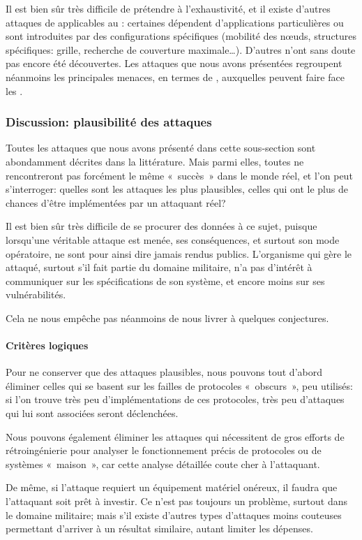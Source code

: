 Il est bien sûr très difficile de prétendre à l'exhaustivité, et il existe d'autres attaques de \dds applicables au \rcs: certaines dépendent d'applications particulières ou sont introduites par des configurations spécifiques (mobilité des nœuds, structures spécifiques: grille, recherche de couverture maximale\dots).
D'autres n'ont sans doute pas encore été découvertes.
Les attaques que nous avons présentées regroupent néanmoins les principales menaces, en termes de \dds, auxquelles peuvent faire face les \rcs.

    \subsubsection{Discussion: plausibilité des attaques}
Toutes les attaques que nous avons présenté dans cette sous-section sont abondamment décrites dans la littérature.
Mais parmi elles, toutes ne rencontreront pas forcément le même « succès » dans le monde réel, et l'on peut s'interroger: quelles sont les attaques les plus plausibles, \cad celles qui ont le plus de chances d'être implémentées par un attaquant réel?

Il est bien sûr très difficile de se procurer des données à ce sujet, puisque lorsqu'une véritable attaque est menée, ses conséquences, et surtout son mode opératoire, ne sont pour ainsi dire jamais rendus publics.
L'organisme qui gère le \rc attaqué, surtout s'il fait partie du domaine militaire, n'a pas d'intérêt à communiquer sur les spécifications de son système, et encore moins sur ses vulnérabilités.

Cela ne nous empêche pas néanmoins de nous livrer à quelques conjectures.

        \paragraph{Critères logiques}
Pour ne conserver que des attaques plausibles, nous pouvons tout d'abord éliminer celles qui se basent sur les failles de protocoles « obscurs », peu utilisés: si l'on trouve très peu d'implémentations de ces protocoles, très peu d'attaques qui lui sont associées seront déclenchées.

Nous pouvons également éliminer les attaques qui nécessitent de gros efforts de rétroingénierie pour analyser le fonctionnement précis de protocoles ou de systèmes « maison », car cette analyse détaillée coute cher à l'attaquant.

De même, si l'attaque requiert un équipement matériel onéreux, il faudra que l'attaquant soit prêt à investir.
Ce n'est pas toujours un problème, surtout dans le domaine militaire; mais s'il existe d'autres types d'attaques moins couteuses permettant d'arriver à un résultat similaire, autant limiter les dépenses.

